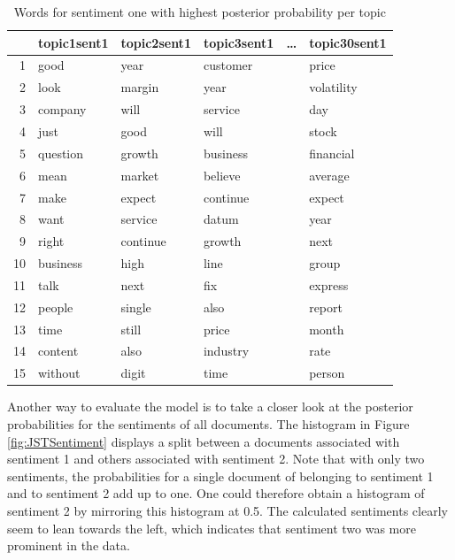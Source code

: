 \begin{table}[ht]
\centering
\begin{tabular}{rlllll}
  \hline
 & topic1sent1 & topic2sent1 & topic3sent1 & \dots & topic30sent1 \\ 
  \hline
1 & good & year & customer & &price \\ 
  2 & look & margin & year & &volatility \\ 
  3 & company & will & service & &day \\ 
  4 & just & good & will & &stock \\ 
  5 & question & growth & business & &financial \\ 
  6 & mean & market & believe & &average \\ 
  7 & make & expect & continue & &expect \\ 
  8 & want & service & datum & &year \\ 
  9 & right & continue & growth & &next \\ 
  10 & business & high & line & &group \\ 
  11 & talk & next & fix & &express \\ 
  12 & people & single & also & &report \\ 
  13 & time & still & price & &month \\ 
  14 & content & also & industry & &rate \\ 
  15 & without & digit & time & &person \\ 
   \hline
\end{tabular}
\caption{Words for sentiment one with highest posterior probability per topic}
\label{tab:postProbSent1}
\end{table}
Another way to evaluate the model is to take a closer look at the posterior probabilities for the sentiments of all documents. The histogram in Figure \ref{fig:JSTSentiment} displays a split between a documents associated with sentiment 1 and others associated with sentiment 2. Note that with only two sentiments, the probabilities for a single document of belonging to sentiment 1 and to sentiment 2 add up to one. One could therefore obtain a histogram of sentiment 2 by mirroring this histogram at 0.5. The calculated sentiments clearly seem to lean towards the left, which indicates that sentiment two was more prominent in the data. \\
